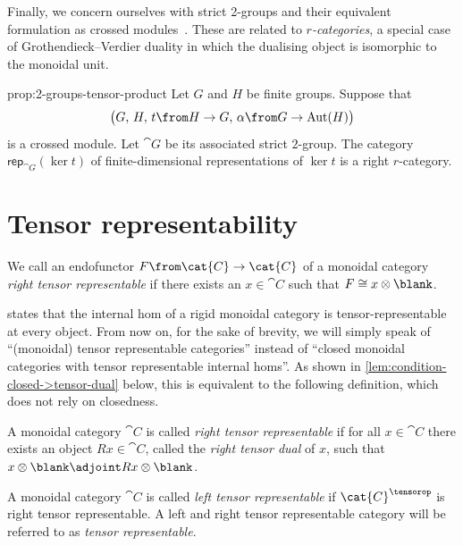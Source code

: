 Finally, we concern ourselves with strict 2-groups and their equivalent formulation as crossed modules~\cite{wagemann2021:CrossedModules}.
These are related to \emph{\(r\)-categories},
a special case of Grothendieck–Verdier duality
in which the dualising object is isomorphic to the monoidal unit.

\begin{reptheorem}{prop:2-groups-tensor-product}
  Let \(G\) and \(H\) be finite groups.
  Suppose that
  \[
    \big( G,\, H,\, t\from H \to G,\, \alpha \from G \to \mathrm{Aut}(H) \big)
  \]
  is a crossed module.
  Let \(\cat{G}\) be its associated strict \(2\)\hyp{}group.
  The category \(\mathsf{rep}_{\cat{G}}(\ker t)\)
  of finite-dimensional representations of \(\ker t\)
  is a right \(r\)\hyp{}category.
\end{reptheorem}

\section{Tensor representability}\label{sec:tensor-rep->gv}

\begin{definition}\label{def:tensor-representable-endo-functors}
  We call an endofunctor \(F\from \cat{C} \to\cat{C}\) of a monoidal category \emph{right tensor representable}
  if there exists an \(x \in\cat{C}\) such that \(F \cong x \otimes \blank \).
\end{definition}

 states that the internal hom of a rigid monoidal category is tensor-re\-pre\-sent\-able at every object.
From now on, for the sake of brevity, we will simply speak of ``(monoidal) tensor representable categories'' instead of ``closed monoidal categories with tensor representable internal homs''.
As shown in \cref{lem:condition-closed->tensor-dual} below, this is equivalent to the following definition, which does not rely on closedness.

\begin{definition}\label{def:tensor-representable}
  A monoidal category \(\cat{C}\) is called \emph{right tensor representable}
  if for all \(x \in \cat{C}\) there exists an object \(Rx \in\cat{C}\),
  called the \emph{right tensor dual} of \(x\),
  such that
  \(x \otimes \blank \adjoint Rx \otimes \blank\).
\end{definition}

A monoidal category \(\cat{C}\) is called \emph{left tensor representable} if \(\cat{C}^{\tensorop}\) is right tensor representable.
A left and right tensor repre\-sentable category will be referred to as \emph{tensor representable}.

